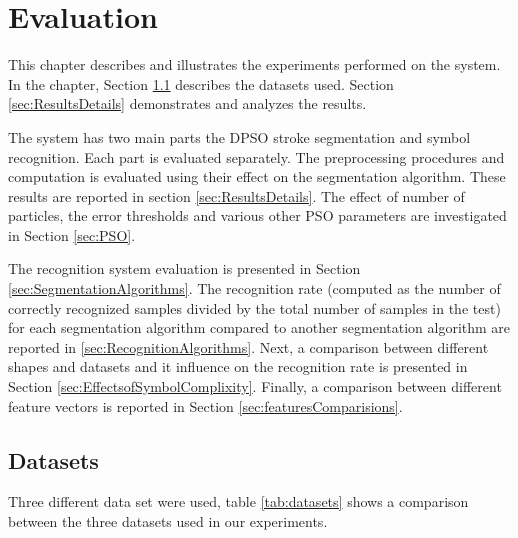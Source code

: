 
\chapter{Evaluation}
\label{sec:Evaluation}
This chapter describes and illustrates the experiments performed on the system. In the chapter, Section \ref{sec:Datasets} describes the datasets used. Section \ref{sec:ResultsDetails} demonstrates and analyzes the results. 

The system has two main parts the DPSO stroke segmentation and symbol recognition. Each part is evaluated separately. The preprocessing procedures and computation is evaluated using their effect on the segmentation algorithm. These results are reported in section \ref{sec:ResultsDetails}. The effect of number of particles, the error thresholds and various other PSO parameters are investigated in Section \ref{sec:PSO}. %

The recognition system evaluation is presented in Section \ref{sec:SegmentationAlgorithms}. The recognition rate (computed as the number of correctly recognized samples divided by the total number of samples in the test) for each segmentation algorithm compared to another segmentation algorithm are reported in \ref{sec:RecognitionAlgorithms}. Next, a comparison between different shapes and datasets and it influence on the recognition rate is presented in Section \ref{sec:EffectsofSymbolComplixity}. Finally, a comparison between different feature vectors is reported in Section \ref{sec:featuresComparisions}.

\section{Datasets}
\label{sec:Datasets}
Three different data set were used, table \ref{tab:datasets} shows a comparison between the three datasets used in our experiments. 

